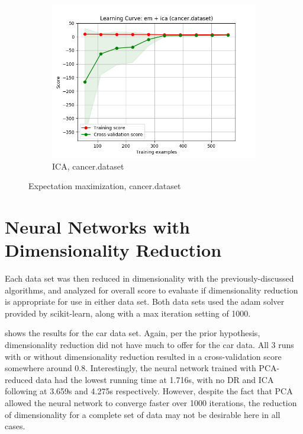 \documentclass{article}
\begin{document}
\begin{figure}[htb]
\begin{subfigure}{0.33\textwidth}
        \includegraphics[width=\linewidth]{out/cluster_dr/cancer-em-ica-learning.png}
        \caption{ICA, cancer.dataset}
      \end{subfigure}

    \caption{Expectation maximization, cancer.dataset}
    \label{fig:cdr-plot-em-cancer}
    \end{figure}

  \section{Neural Networks with Dimensionality Reduction}
    Each data set was then reduced in dimensionality with the previously-discussed algorithms, and analyzed for overall score to evaluate if dimensionality reduction is appropriate for use in either data set. Both data sets used the adam solver provided by scikit-learn, along with a max iteration setting of 1000.

     shows the results for the car data set. Again, per the prior hypothesis, dimensionality reduction did not have much to offer for the car data. All 3 runs with or without dimensionality reduction resulted in a cross-validation score somewhere around 0.8. Interestingly, the neural network trained with PCA-reduced data had the lowest running time at 1.716s, with no DR and ICA following at 3.659s and 4.275s respectively. However, despite the fact that PCA allowed the neural network to converge faster over 1000 iterations, the reduction of dimensionality for a complete set of data may not be desirable here in all cases.
\end{document}
